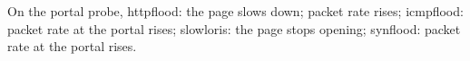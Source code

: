 On the portal probe, httpflood: the page slows down; packet rate rises; icmpflood: packet rate at the portal rises; slowloris: the page stops opening; synflood: packet rate at the portal rises.
